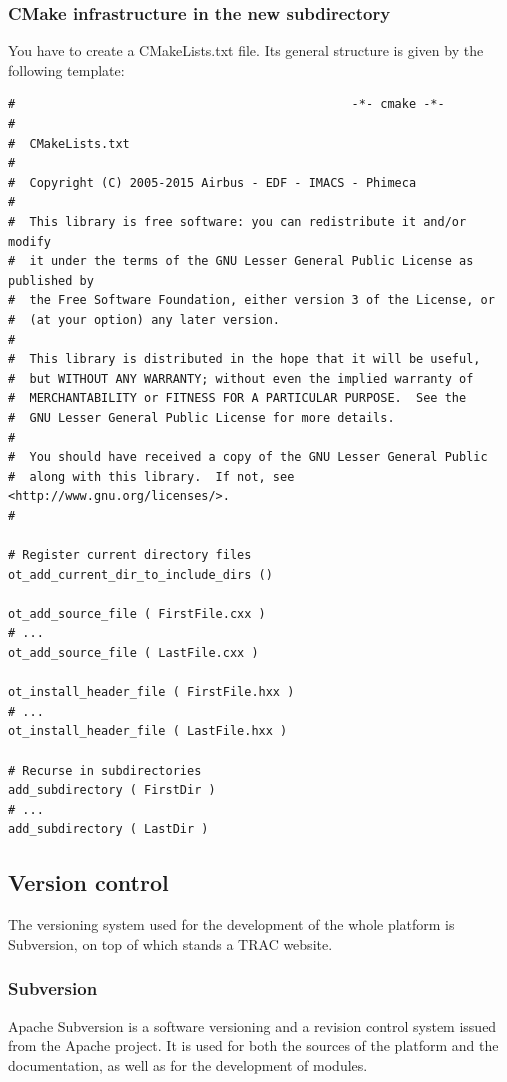\subsubsection{CMake infrastructure in the new subdirectory}
You have to create a CMakeLists.txt file. Its general structure is given by the following template:
\begin{lstlisting}
#                                               -*- cmake -*-
#
#  CMakeLists.txt
#
#  Copyright (C) 2005-2015 Airbus - EDF - IMACS - Phimeca
#
#  This library is free software: you can redistribute it and/or modify
#  it under the terms of the GNU Lesser General Public License as published by
#  the Free Software Foundation, either version 3 of the License, or
#  (at your option) any later version.
#
#  This library is distributed in the hope that it will be useful,
#  but WITHOUT ANY WARRANTY; without even the implied warranty of
#  MERCHANTABILITY or FITNESS FOR A PARTICULAR PURPOSE.  See the
#  GNU Lesser General Public License for more details.
#
#  You should have received a copy of the GNU Lesser General Public
#  along with this library.  If not, see <http://www.gnu.org/licenses/>.
#

# Register current directory files
ot_add_current_dir_to_include_dirs ()

ot_add_source_file ( FirstFile.cxx )
# ...
ot_add_source_file ( LastFile.cxx )

ot_install_header_file ( FirstFile.hxx )
# ...
ot_install_header_file ( LastFile.hxx )

# Recurse in subdirectories
add_subdirectory ( FirstDir )
# ...
add_subdirectory ( LastDir )

\end{lstlisting}

\subsection{Version control}

The versioning system used for the development of the whole platform is Subversion, on top of which stands a TRAC website.

\subsubsection{Subversion}

Apache Subversion is a software versioning and a revision control system issued from the Apache project. It is used for both the sources of the platform and the documentation, as well as for the development of modules.

